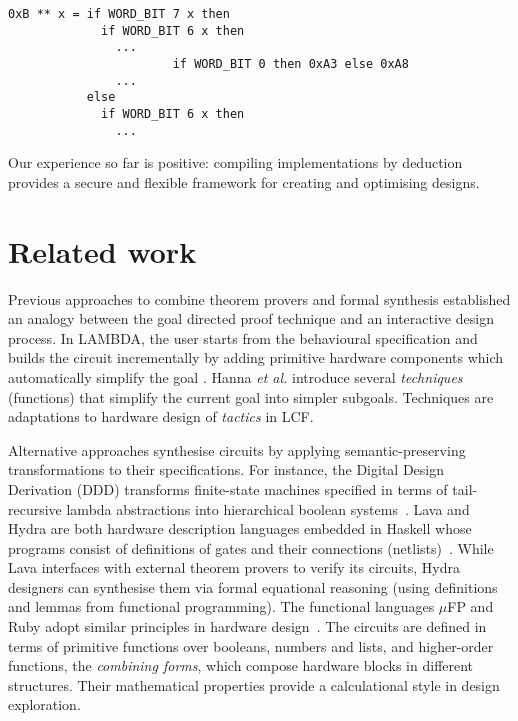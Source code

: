 \documentclass{llncs}
\begin{document}
\vspace*{-2mm}

{\footnotesize\baselineskip10pt\begin{verbatim}
0xB ** x = if WORD_BIT 7 x then
             if WORD_BIT 6 x then 
               ...
                       if WORD_BIT 0 then 0xA3 else 0xA8
               ...
           else
             if WORD_BIT 6 x then
               ...
\end{verbatim}}

\vspace*{-2mm}

Our experience so far is positive: compiling implementations by
deduction provides a secure and flexible framework for creating and
optimising designs.

\section{Related work}
\label{secRelatedWork}
Previous approaches to combine theorem provers 
and formal synthesis established an analogy between
the goal directed proof technique and an interactive 
design process. In LAMBDA, the user starts from the behavioural
specification and builds the circuit incrementally
by adding primitive hardware components
which automatically simplify the goal \cite{Fou89}.
Hanna {\em et al.\/} \cite{HLD89} introduce
several {\em techniques\/} (functions) that
simplify the current goal into simpler subgoals.
Techniques are adaptations to hardware design
of {\em tactics\/} in LCF.

Alternative approaches synthesise circuits
by applying semantic-preserving transformations
to their specifications. For instance,
the Digital Design Derivation (DDD) transforms
finite-state machines specified in terms of
tail-recursive lambda abstractions into hierarchical
boolean systems~\cite{Johnson90}. Lava and Hydra
are both hardware description languages embedded
in Haskell whose programs
consist of definitions of gates and their 
connections (netlists)~\cite{BCSS99,OD02}. While Lava interfaces with
external theorem provers to verify its circuits,
Hydra designers can synthesise them
via formal equational reasoning
(using definitions and lemmas from functional programming).
The functional languages $\mu$FP and Ruby
adopt similar principles in hardware design~\cite{JS90,She84}.
The circuits are defined in terms of primitive
functions over booleans, numbers and lists, and
higher-order functions, the {\em combining forms\/},
which compose hardware blocks in different
structures. Their mathematical properties provide
a calculational style in design exploration.
\end{document}
